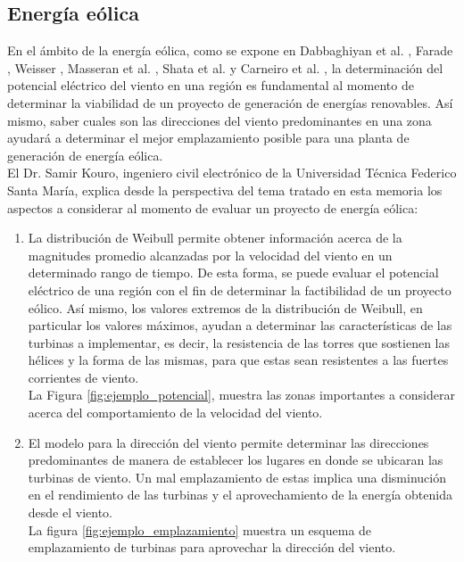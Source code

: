 \subsection{Energía eólica}
En el ámbito de la energía eólica, como se expone en Dabbaghiyan et al. \cite{Dabbaghiyan15}, Farade \cite{Fadare08}, Weisser \cite{Weisser02}, Masseran et al. \cite{Winddirelse15}, Shata et al. \cite{Shata05} y Carneiro et al. \cite{Carneiro15}, la determinación del potencial eléctrico del viento en una región es fundamental al momento de determinar la viabilidad de un proyecto de generación de energías renovables. Así mismo, saber cuales son las direcciones del viento predominantes en una zona ayudará a determinar el mejor emplazamiento posible para una planta de generación de energía eólica.\\
El Dr. Samir Kouro, ingeniero civil electrónico de la Universidad Técnica Federico Santa María, explica desde la perspectiva del tema tratado en esta memoria los aspectos a considerar al momento de evaluar un proyecto de energía eólica:
\begin{enumerate}
  \item La distribución de Weibull permite obtener información acerca de la magnitudes promedio alcanzadas por la velocidad del viento en un determinado rango de tiempo. De esta forma, se puede evaluar el potencial eléctrico de una región con el fin de determinar la factibilidad de un proyecto eólico. Así mismo, los valores extremos de la distribución de Weibull, en particular los valores máximos, ayudan a determinar las características de las turbinas a implementar, es decir, la resistencia de las torres que sostienen las hélices y la forma de las mismas, para que estas sean resistentes a las fuertes corrientes de viento.\\ 
  La Figura \ref{fig:ejemplo_potencial}, muestra las zonas importantes a considerar acerca del comportamiento de la velocidad del viento.
  \item El modelo para la dirección del viento permite determinar las direcciones predominantes de manera de establecer los lugares en donde se ubicaran las turbinas de viento. Un mal emplazamiento de estas implica una disminución en el rendimiento de las turbinas y el aprovechamiento de la energía obtenida desde el viento.\\
  La figura \ref{fig:ejemplo_emplazamiento} muestra un esquema de emplazamiento de turbinas para aprovechar la dirección del viento.\\
\end{enumerate}
